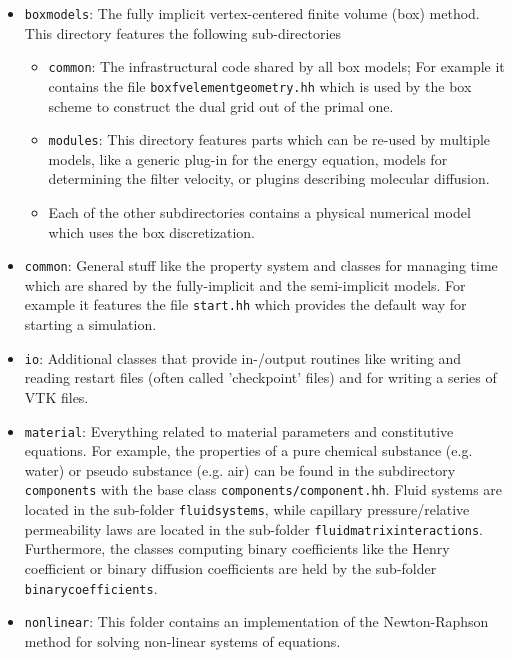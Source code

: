 \begin{itemize}

\item \texttt{boxmodels}: The fully implicit vertex-centered finite
  volume (box) method. This directory features the following
  sub-directories
  \begin{itemize}
  \item \texttt{common}: The infrastructural code shared by all box
    models; For example it contains the file
    \texttt{boxfvelementgeometry.hh} which is used by the box scheme to
    construct the dual grid out of the primal one.
  \item \texttt{modules}: This directory features parts which can be
    re-used by multiple models, like a generic plug-in for the energy
    equation, models for determining the filter velocity, or plugins
    describing molecular diffusion.
  \item Each of the other subdirectories contains
    a physical numerical model which uses the box discretization.
  \end{itemize}

\item \texttt{common}: General stuff like the \eWoms property system
  and classes for managing time which are shared by the fully-implicit
  and the semi-implicit models.  For example it features the file
  \texttt{start.hh} which provides the default way for starting a
  simulation.

\item \texttt{io}: Additional classes that provide in-/output routines
  like writing and reading restart files (often called 'checkpoint'
  files) and for writing a series of VTK files.

\item \texttt{material}: Everything related to material parameters and
  constitutive equations. For example, the properties of a pure
  chemical substance (e.g. water) or pseudo substance (e.g. air) can
  be found in the subdirectory \texttt{components} with the base class
  \texttt{components/component.hh}. Fluid systems are located in the
  sub-folder \texttt{fluidsystems}, while capillary pressure/relative
  permeability laws are located in the sub-folder
  \texttt{fluidmatrixinteractions}. Furthermore, the classes computing
  binary coefficients like the Henry coefficient or binary diffusion
  coefficients are held by the sub-folder \texttt{binarycoefficients}.

\item \texttt{nonlinear}: This folder contains an implementation of
  the Newton-Raphson method for solving non-linear systems of
  equations.


\end{itemize}
